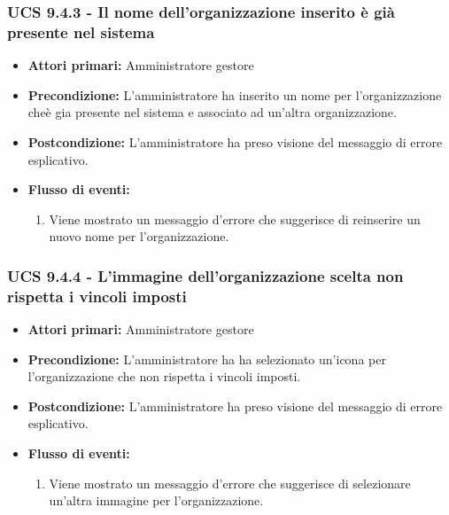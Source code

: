 \subsubsection{UCS 9.4.3 - Il nome dell'organizzazione inserito è già presente nel sistema}%
\begin{itemize}
\item \textbf{Attori primari:} Amministratore gestore
\item \textbf{Precondizione:} L'amministratore ha inserito un nome per l'organizzazione cheè gia presente nel sistema e associato ad un'altra organizzazione.
\item \textbf{Postcondizione:} L'amministratore ha preso visione del messaggio di errore esplicativo.
\item \textbf{Flusso di eventi:}
    \begin{enumerate}
    \item Viene mostrato un messaggio d'errore che suggerisce di reinserire un nuovo nome per l'organizzazione.
    \end{enumerate} 
\end{itemize}

\subsubsection{UCS 9.4.4 - L'immagine dell'organizzazione scelta non rispetta i vincoli imposti}%
\begin{itemize}
\item \textbf{Attori primari:} Amministratore gestore
\item \textbf{Precondizione:} L'amministratore ha ha selezionato un'icona per l'organizzazione che non rispetta i vincoli imposti.
\item \textbf{Postcondizione:} L'amministratore ha preso visione del messaggio di errore esplicativo.
\item \textbf{Flusso di eventi:}
    \begin{enumerate}
    \item Viene mostrato un messaggio d'errore che suggerisce di selezionare un'altra immagine per l'organizzazione.
    \end{enumerate} 
\end{itemize}

